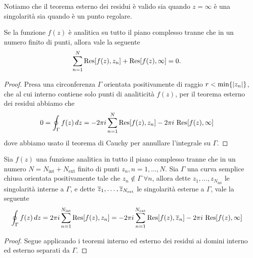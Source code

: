 Notiamo che il teorema esterno dei residui è valido sia quando $ z = \infty $ è una singolarità sia quando è un punto regolare. 

\begin{corollary}
  Se la funzione $ f(z) $ è analitica su tutto il piano complesso tranne che in un numero finito di punti, allora vale la seguente 
  \begin{align}
    \sum_{n = 1}^{N} \operatorname{\textnormal{Res}}[ f(z), z_n ] + \operatorname{\textnormal{Res}}[ f(z), \infty ] = 0.
  \end{align}
\end{corollary}
\begin{proof}
  Presa una circonferenza $ \Gamma $ orientata positivamente di raggio $ r < \min\{\left|{z_n}\right|\} $, 
  che al cui interno contiene solo punti di analiticità $ f(z) $, per il teorema esterno dei residui abbiamo che 
  \begin{align}
    0 = \oint_\Gamma f(z)\,dz = - 2\pi i \sum_{n = 1}^{N} \operatorname{\textnormal{Res}}[ f(z), z_n ] - 2\pi i \,\operatorname{\textnormal{Res}}[ f(z), \infty ] 
  \end{align}
  dove abbiamo usato il teorema di Cauchy per annullare l'integrale su $ \Gamma $.
\end{proof}

\begin{corollary}
  Sia $ f(z) $ una funzione analitica in tutto il piano complesso tranne che in un numero $ N = N_{\text{int}} + N_{\text{ext}} $ 
  finito di punti $ z_n, n = 1, \dots, N$. Sia $ \Gamma $ una curva semplice chiusa orientata positivamente 
  tale che $ z_n \notin \Gamma \; \forall n  $, allora dette $ z_1, \dots, z_{N_{\text{int}}} $ le singolarità interne a $ \Gamma $, e dette 
  $ \overline{z}_1, \dots, \overline{z}_{N_{\text{ext}}} $ le singolarità esterne a $ \Gamma $, vale la seguente 
  \begin{align}
    \oint_\Gamma f(z)\,dz = 2 \pi i \sum_{n = 1}^{N_{\text{int}}}\operatorname{\textnormal{Res}}[ f(z), z_n ] 
    = - 2 \pi i \sum_{n = 1}^{N_{\text{ext}}}\operatorname{\textnormal{Res}}[ f(z), \overline{z}_n ] - 2\pi i \,\operatorname{\textnormal{Res}}[ f(z), \infty ] 
  \end{align}
\end{corollary}
\begin{proof}
  Segue applicando i teoremi interno ed esterno dei residui ai domini interno ed esterno separati da $ \Gamma $.
\end{proof}

